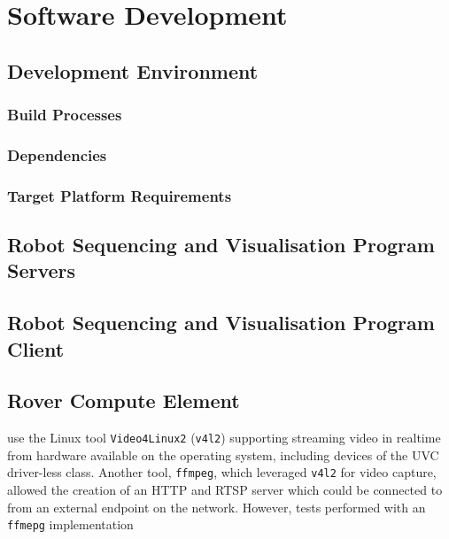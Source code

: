 \section{Software Development}
\label{sec:softwareDevelopment}
  \subsection{Development Environment}
    \subsubsection{Build Processes}
    \subsubsection{Dependencies}
    \subsubsection{Target Platform Requirements} 
    
  \subsection{Robot Sequencing and Visualisation Program Servers}
  \subsection{Robot Sequencing and Visualisation Program Client}
  \subsection{Rover Compute Element}
  
  
  
  use the Linux tool \texttt{Video4Linux2} (\texttt{v4l2}) supporting streaming video in realtime from hardware available on the operating system, including devices of the UVC driver-less class. Another tool, \texttt{ffmpeg}, which leveraged \texttt{v4l2} for video capture, allowed the creation of an HTTP and RTSP server which could be connected to from an external endpoint on the network. However, tests performed with an \texttt{ffmepg} implementation
  
